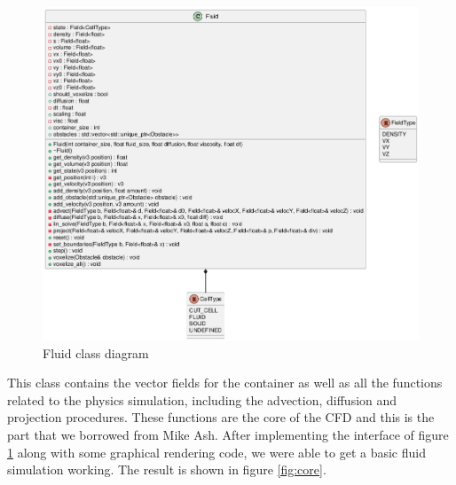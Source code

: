 \documentclass[a4paper,12pt,titlepage]{article}
\begin{document}
\begin{figure}[H]
	\centering
	\includegraphics[width=\textwidth]{resources/Fluid.png}
	\caption{Fluid class diagram}
	\label{fig:interface}
\end{figure}

This class contains the vector fields for the container as well as all the
functions related to the physics simulation, including the advection, diffusion
and projection procedures. These functions are the core of the CFD and
this is the part that we borrowed from Mike Ash. After implementing the
interface of figure \ref{fig:interface} along with some graphical
rendering code, we were able to get a basic fluid simulation working. The
result is shown in figure \ref{fig:core}.
\end{document}
